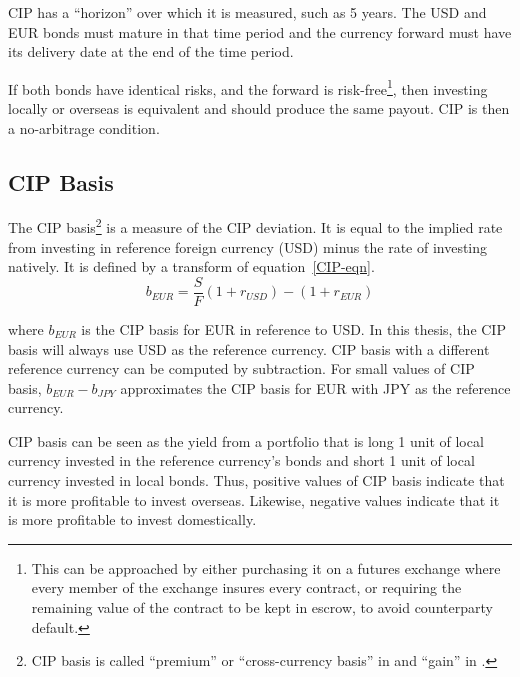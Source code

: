 CIP has a ``horizon'' over which it is measured, such as 5 years.  The USD and EUR bonds must mature in that time period and the currency forward must have its delivery date at the end of the time period.  


If both bonds have identical risks, and the forward is risk-free\footnote{This can be approached by either purchasing it on a futures exchange where every member of the exchange insures every contract, or requiring the remaining value of the contract to be kept in escrow, to avoid counterparty default.}, then investing locally or overseas is equivalent and should produce the same payout.  CIP is then a no-arbitrage condition. 


\subsection{CIP Basis}


The CIP basis\footnote{CIP basis is called ``premium'' or ``cross-currency basis'' in \cite{Du2017} and ``gain'' in \cite{Ito1983}.} is a measure of the CIP deviation.  It is equal to the implied rate from investing in reference foreign currency (USD) minus the rate of investing natively.  It is defined by a transform of equation~\ref{CIP-eqn}.
\begin{equation} 
  \label{basis-eqn} 
   b_{EUR} = \frac{S}{F}(1 + r_{USD}) - (1 + r_{EUR})
\end{equation} 

\noindent where $b_{EUR}$ is the CIP basis for EUR in reference to USD.  In this thesis, the CIP basis will always use USD as the reference currency.   CIP basis with a different reference currency can be computed by subtraction.  For small values of CIP basis, $b_{EUR} - b_{JPY}$ approximates the CIP basis for EUR with JPY as the reference currency.  

CIP basis can be seen as the yield from a portfolio that is long 1 unit of local currency invested in the reference currency's bonds and short 1 unit of local currency invested in local bonds.  Thus, positive values of CIP basis indicate that it is more profitable to invest overseas.  Likewise, negative values indicate that it is more profitable to invest domestically.  

